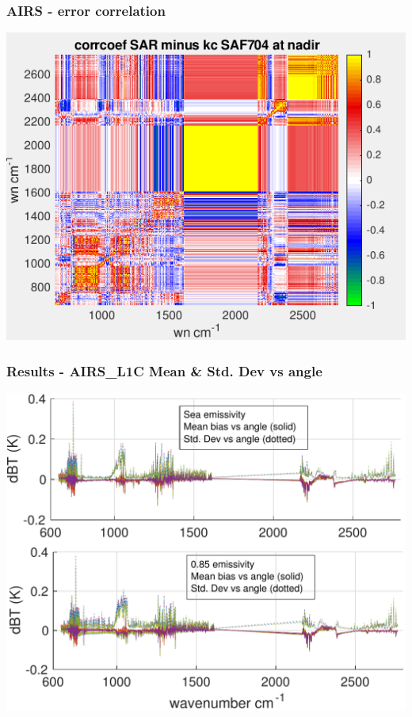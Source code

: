 \documentclass[10pt,t]{beamer}
\begin{document}
\begin{frame}
  \frametitle{AIRS - error correlation}
  \begin{center}
    \includegraphics[width=0.9\linewidth]{./Figs/Png/plot6_wavenumber_sorted.png}
  \end{center}
      
 \end{frame}

\begin{frame}
  \frametitle{Results - AIRS\_L1C Mean \& Std. Dev vs angle}

  \begin{center}
    \includegraphics[width=0.9\linewidth]{./Figs/Pdf/kc_sar_airs_l1c_mean_stdv_emiss_vs_angle_v2.pdf}
  \end{center}
  
  \end{frame}
\end{document}
